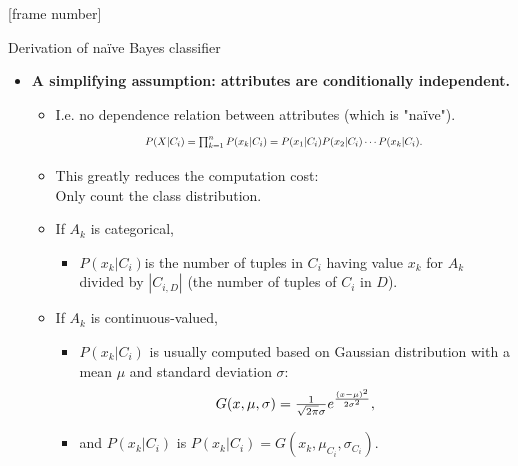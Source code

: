 \documentclass[aspectratio=169,t,table]{beamer}
\begin{document}
  {
    [frame number]
    \begin{frame}{Derivation of naïve Bayes classifier}
        \begin{itemize}
          \item \textbf{A simplifying assumption: attributes are {\color{airforceblue}conditionally independent}.}
          \begin{itemize}
            \item I.e. no dependence relation between attributes (which is "naïve").
            \begin{align*}
              \resizebox{7cm}{!}{%
              $P(X|C_i) = \prod_{k=1}^{n} P(x_k|C_i) = P(x_1|C_i)P(x_2|C_i)\cdots P(x_k|C_i).$}
            \end{align*}
            \item This greatly reduces the computation cost:\\
                  Only count the class distribution.
            \item If $A_k$ is categorical,
            \begin{itemize}
              \item $P(x_k|C_i)$is the number of tuples in $C_i$ having value $x_k$ for $A_k$ \\
                    divided by $|C_{i,D}|$ (the number of tuples of $C_i$ in $D$).
            \end{itemize}
            \item If $A_k$ is continuous-valued,
            \begin{itemize}
              \item $P(x_k|C_i)$ is usually computed based on Gaussian distribution with a mean $\mu$ and standard deviation $\sigma$:
              \begin{align*}
                \resizebox{4cm}{!}{%
                $G(x,\mu,\sigma) = \frac{1}{\sqrt{2\pi}\sigma}e^{\frac{(x-\mu)^2}{2\sigma^2}},$}
              \end{align*}
              \item and $P(x_k|C_i)$ is $P(x_k|C_i) = G(x_k,\mu_{C_i},\sigma_{C_i})$.
            \end{itemize}
          \end{itemize}
        \end{itemize}
    \end{frame}
  }
\end{document}
